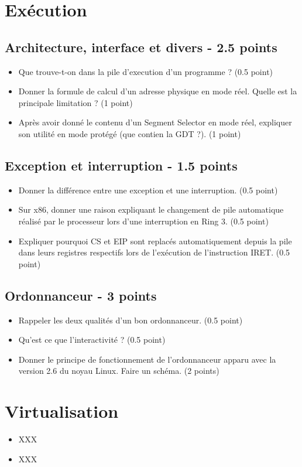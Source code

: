 \section{Ex\'ecution
         {\hfill{} }}

\subsection{Architecture, interface et divers - 2.5 points}
\begin{itemize}
\item Que trouve-t-on dans la pile d'execution d'un programme ? (0.5 point)
\item Donner la formule de calcul d'un adresse physique en mode r\'eel. Quelle est la principale limitation ?  (1 point)
\item Apr\`es avoir donn\'e le contenu d'un Segment Selector en mode r\'eel, expliquer son utilit\'e en mode prot\'eg\'e (que contien la GDT ?).  (1 point)
\end{itemize}

\subsection{Exception et interruption -  1.5 points}
 \begin{itemize}
\item Donner la diff\'erence entre une exception et une interruption. (0.5 point)
\item Sur x86, donner une raison expliquant le changement de pile automatique r\'ealis\'e par le processeur lors d'une interruption en Ring 3. (0.5 point)
\item Expliquer pourquoi CS et EIP sont replac\'es automatiquement depuis la pile dans leurs registres respectifs lors de l'ex\'ecution de l'instruction IRET. (0.5 point)
\end{itemize}

\subsection{Ordonnanceur - 3 points}
 \begin{itemize}
\item Rappeler les deux qualit\'es d'un bon ordonnanceur. (0.5 point)
\item Qu'est ce que l'interactivit\'e ? (0.5 point)
\item Donner le principe de fonctionnement de l'ordonnanceur apparu avec la version 2.6 du noyau Linux. Faire un sch\'ema. (2 points)
\end{itemize}

%
%

\section{Virtualisation
         }

\begin{itemize}
  \item
    XXX
\end{itemize}

\begin{correction}

\begin{itemize}
  \item
    XXX
\end{itemize}

\end{correction}


